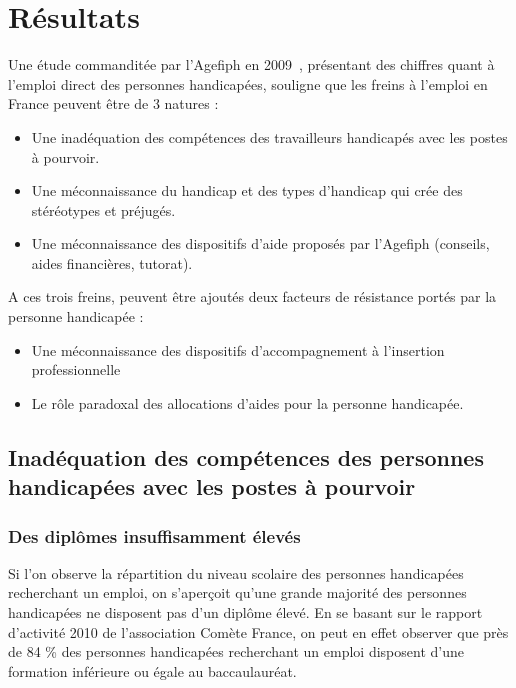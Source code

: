 \chapter{Résultats}
\label{resultats}

Une étude commanditée par l'Agefiph en 2009~\cite{etudeAgefiph1}, présentant des chiffres quant à l'emploi direct des personnes handicapées, souligne que les freins à l'emploi en France peuvent \^etre de 3 natures :
\begin{itemize}
\item Une inadéquation des compétences des travailleurs handicapés avec les postes à pourvoir.
\item Une méconnaissance du handicap et des types d'handicap qui crée des stéréotypes et préjugés.
\item Une méconnaissance des dispositifs d'aide proposés par l'Agefiph (conseils, aides financières, tutorat). \\
\end{itemize}

A ces trois freins, peuvent être ajoutés deux facteurs de résistance portés par la personne handicapée :
\begin{itemize}
\item Une méconnaissance des dispositifs d'accompagnement à l'insertion professionnelle
\item Le rôle paradoxal des allocations d'aides pour la personne handicapée.\\
\end{itemize}



\section{Inadéquation des compétences des personnes handicapées avec les postes à pourvoir}

\subsection{Des diplômes insuffisamment élevés}
Si l'on observe la répartition du niveau scolaire des personnes handicapées recherchant un emploi, on s'aperçoit qu'une grande majorité des personnes handicapées ne disposent pas d'un diplôme élevé.
En se basant sur le rapport d'activité 2010 de l'association Comète France, on peut en effet observer que près de 84 \% des personnes handicapées recherchant un emploi disposent d'une formation inférieure ou égale au baccaulauréat.

